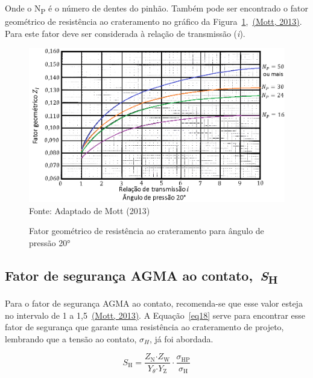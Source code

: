 \documentclass[12pt,a4paper]{article}
\begin{document}
Onde o N\textsubscript{P} é o número de dentes do pinhão. Também pode
ser encontrado o fator geométrico de resistência ao crateramento no
gráfico da Figura~{\ref{fig:14}},~\hyperref[csl:21]{(Mott, 2013)}.
Para este fator deve ser considerada à relação de transmissão
(\emph{i}).

\begin{figure}[!htb]
    \centering
    \caption{Fator geométrico de resistência ao crateramento para ângulo de pressão 20°}
    \includegraphics[scale=0.6]{Imagens/Img14.png}\\
    {\footnotesize Fonte: Adaptado de Mott (2013)}
    \label{fig:14}
\end{figure}

\subsection*{\texorpdfstring{Fator de segurança AGMA ao
contato,~\emph{S}\textsubscript{H}}{Fator de segurança AGMA ao contato,~SH}}

{\label{fator-de-seguranuxe7a-agma-ao-contato-sh}}

Para o fator de segurança AGMA ao contato, recomenda-se que esse valor
esteja no intervalo de 1 a 1,5~\hyperref[csl:21]{(Mott, 2013)}. A
Equação~{\ref{eq18}} serve para encontrar esse fator de
segurança que garante uma resistência ao crateramento de projeto,
lembrando que a tensão ao contato, $\sigma_H$, já foi abordada.

\begin{equation}
\label{eq18}
S_{\mathrm{H}}\mathrm{=}\frac{Z_{\mathrm{N}}\mathrm{\cdot }Z_{\mathrm{W}}}{Y_{\theta }\mathrm{\cdot }Y_{\mathrm{Z}}}\cdot \frac{{\sigma }_{\mathrm{HP}}}{{\sigma }_{\mathrm{H}}}
\end{equation}
\end{document}
